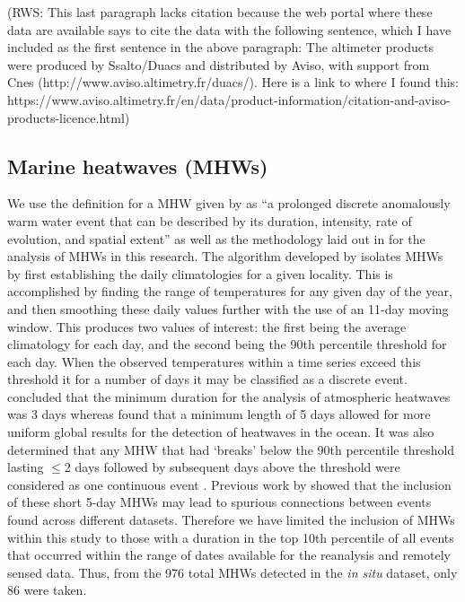 \documentclass[a4paper,10pt,review]{elsarticle}
\begin{document}
(RWS: This last paragraph lacks citation because the web portal where these data are available says to cite the data with the following sentence, which I have included as the first sentence in the above paragraph:
The altimeter products were produced by Ssalto/Duacs and distributed by Aviso, with support from Cnes (http://www.aviso.altimetry.fr/duacs/).
Here is a link to where I found this:
https://www.aviso.altimetry.fr/en/data/product-information/citation-and-aviso-products-licence.html)

\subsection{Marine heatwaves (MHWs)}
We use the definition for a MHW given by \citet{Hobday2016} as ``a prolonged discrete anomalously warm water event that can be described by its duration, intensity, rate of evolution, and spatial extent'' as well as the methodology laid out in \citet{Hobday2016} for the analysis of MHWs in this research. The algorithm developed by \citet{Hobday2016} isolates MHWs by first establishing the daily climatologies for a given locality. This is accomplished by finding the range of temperatures for any given day of the year, and then smoothing these daily values further with the use of an 11-day moving window. This produces two values of interest: the first being the average climatology for each day, and the second being the 90th percentile threshold for each day. When the observed temperatures within a time series exceed this threshold it for a number of days it may be classified as a discrete event. \citet{Perkins2013} concluded that the minimum duration for the analysis of atmospheric heatwaves was 3 days whereas \citet{Hobday2016} found that a minimum length of 5 days allowed for more uniform global results for the detection of heatwaves in the ocean. It was also determined that any MHW that had `breaks' below the 90th percentile threshold lasting $\leq$2 days followed by subsequent days above the threshold were considered as one continuous event \citep{Hobday2016}. Previous work by \citet{Schlegel2017} showed that the inclusion of these short 5-day MHWs may lead to spurious connections between events found across different datasets. Therefore we have limited the inclusion of MHWs within this study to those with a duration in the top 10th percentile of all events that occurred within the range of dates available for the reanalysis and remotely sensed data. Thus, from the 976 total MHWs detected in the \emph{in situ} dataset, only 86 were taken.
\end{document}
